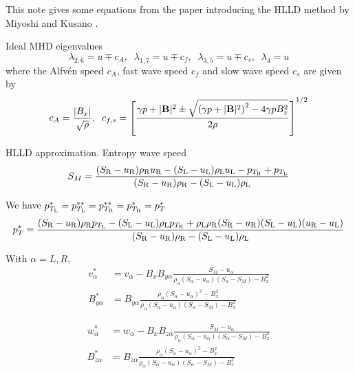 \documentclass[11pt]{article}
\begin{document}
\newcommand\ssBzL{{B_{zL}^{**}}}
\newcommand\ssBzR{{B_{zR}^{**}}}
\newcommand\ssBz{{B_z^{**}}}

\newcommand\sseL{{e^{**}_\stateL}}
\newcommand\sseR{{e^{**}_\stateR}}

\newcommand\seL{{e^{*}_\stateL}}
\newcommand\seR{{e^{*}_\stateR}}
\newcommand\sea{{e^{*}_\alpha}}


\newcommand\den{\sqrt\srhoL+\sqrt\srhoR}

\newcommand\SM{{S_M}}
\newcommand\sSL{{S^{*}_\stateL}}
\newcommand\sSR{{S^{*}_\stateR}}
\newcommand\SmuL{{S_\stateL-u_\stateL}}
\newcommand\SmuR{{S_\stateR-u_\stateR}}
\newcommand\Smua{{S_\alpha-u_\alpha}}

\newcommand\dena{\rho_\alpha(\Smua)(S_\alpha-\SM)-B_x^2}


This note gives some equations from the paper introducing
the HLLD method by
Miyoshi and Kusano \cite{Miyoshi2005}.

Ideal MHD eigenvalues
$$\lambda_{2,6}=u\mp c_A,
\;\;
\lambda_{1,7}=u\mp c_f,
\;\;
\lambda_{3,5}=u\mp c_s,
\;\;
\lambda_4=u
$$
where the Alfv\'en speed $c_A$, fast wave speed $c_f$ and
slow wave speed $c_s$ are given by
$$
c_A=\frac{|B_x|}{\sqrt{\rho}},
\;\;
c_{f,s}=\left[
\frac{\gamma p + |\mathbf{B}|^2\pm
\sqrt{\left(\gamma p + |\mathbf{B}|^2\right)^2-4\gamma p B_x^2}}{2\rho} 
\right]^{1/2}
$$

HLLD approximation.
Entropy wave speed
\begin{equation}
\SM=\frac
{(\SmuR)\rhoR\uR-(\SmuL)\rhoL\uL-\pTR+\pTL}
{(\SmuR)\rhoR-(\SmuL)\rhoL}
\end{equation}


We have ${p^{*}_{T_{\mathrm{L}}}}={p^{**}_{T_{\mathrm{L}}}}={p^{**}_{T_{\mathrm{R}}}}={p^{*}_{T_{\mathrm{R}}}}={p^{*}_{T}}$
\begin{equation}
\spT=\frac
{(\SmuR)\rhoR\pTL-(\SmuL)\rhoL\pTR+\rhoL\rhoR(\SmuR)(\SmuL)(\uR-\uL)}
{(\SmuR)\rhoR-(\SmuL)\rhoL}
\end{equation}

With $\alpha=L,R$,
\begin{align}
v^*_\alpha&= v_\alpha-B_xB_{y\alpha}\frac{\SM-u_\alpha}
{\dena}
\\
B_{y\alpha}^{*}&=B_{y\alpha}\frac{\rho_\alpha(\Smua)^2-B_x^2}
{\dena}
\end{align}

\begin{align}
w^*_\alpha&= w_\alpha-B_xB_{z\alpha}\frac{\SM-u_\alpha}
{\dena}
\\
B_{z\alpha}^{*}&=B_{z\alpha}\frac{\rho_\alpha(\Smua)^2-B_x^2}
{\dena}
\end{align}
\end{document}
